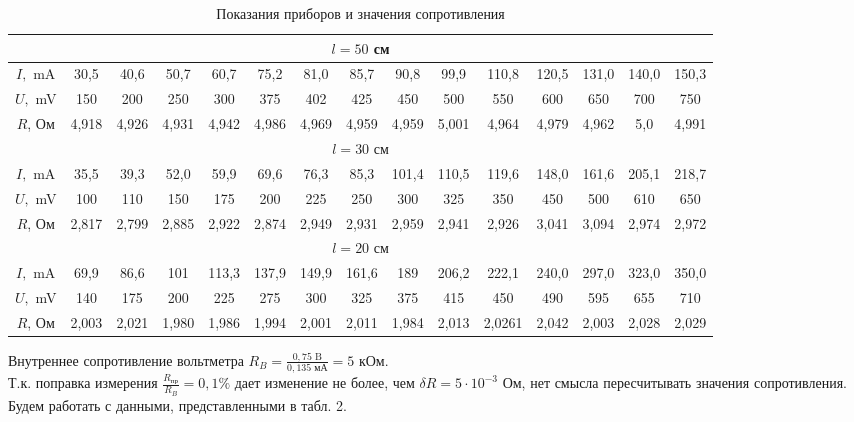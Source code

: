 \documentclass[a4paper]{article}
\begin{document}
\vspace{-0.5cm}
\begin{table}[h]
\caption{Показания приборов и значения сопротивления}
\centering
\begin{tabular}{|c|c|c|c|c|c|c|c|c|c|c|c|c|c|c|}
\hline
\multicolumn{15}{|c|}{ $l = 50$ см} \\
\hline
$I,$ mA  & 30,5 & 40,6 & 50,7 & 60,7 & 75,2 & 81,0 & 85,7 & 90,8 & 99,9 & 110,8 & 120,5 & 131,0 & 140,0 & 150,3 \\
\hline
$U,$ mV & 150 & 200 & 250 & 300 & 375 & 402 & 425 & 450 & 500 & 550 & 600 & 650& 700 & 750 \\
\hline
$R$, Ом & 4,918 & 4,926 & 4,931 & 4,942 & 4,986 & 4,969 & 4,959 & 4,959 & 5,001 & 4,964 & 4,979 & 4,962 & 5,0 & 4,991 \\

\hline
\multicolumn{15}{|c|}{ $l = 30$ см} \\
\hline
$I,$ mA & 35,5 & 39,3 & 52,0 & 59,9 & 69,6 & 76,3 & 85,3 & 101,4 & 110,5 & 119,6 & 148,0 & 161,6 & 205,1 & 218,7 \\
\hline
$U,$ mV & 100 & 110 & 150 & 175 & 200 & 225 & 250 & 300 & 325 & 350 & 450 & 500 & 610 & 650 \\
\hline
$R$, Ом & 2,817 & 2,799 & 2,885 & 2,922 & 2,874 & 2,949 & 2,931 & 2,959 & 2,941 & 2,926 & 3,041 & 3,094 & 2,974 & 2,972 \\

\hline
\multicolumn{15}{|c|}{ $l = 20$ см} \\
\hline
$I,$ mA & 69,9 & 86,6 & 101 & 113,3 & 137,9 & 149,9 & 161,6 & 189 & 206,2 & 222,1 & 240,0 & 297,0 & 323,0 & 350,0 \\
\hline
$U,$ mV & 140 & 175 & 200 & 225 & 275 & 300 & 325 & 375 & 415 & 450 & 490 & 595 & 655 & 710 \\
\hline
$R$, Ом & 2,003 & 2,021 & 1,980 & 1,986 & 1,994 & 2,001 & 2,011 & 1,984 & 2,013 & 2,0261 & 2,042 & 2,003 & 2,028 & 2,029 \\
\hline
\end{tabular}
\end{table}

Внутреннее сопротивление вольтметра $R_B = \frac{0,75 \text{ B}}{0,135 \text{ мА}} = 5$ кОм.\\
Т.к. поправка измерения $\frac{R_\text{пр}}{R_B} = 0,1 \%$ дает изменение не более, чем $\delta R = 5 \cdot 10^{-3}$ Ом, нет смысла пересчитывать значения сопротивления. Будем работать с данными, представленными в табл. 2.
\end{document}
